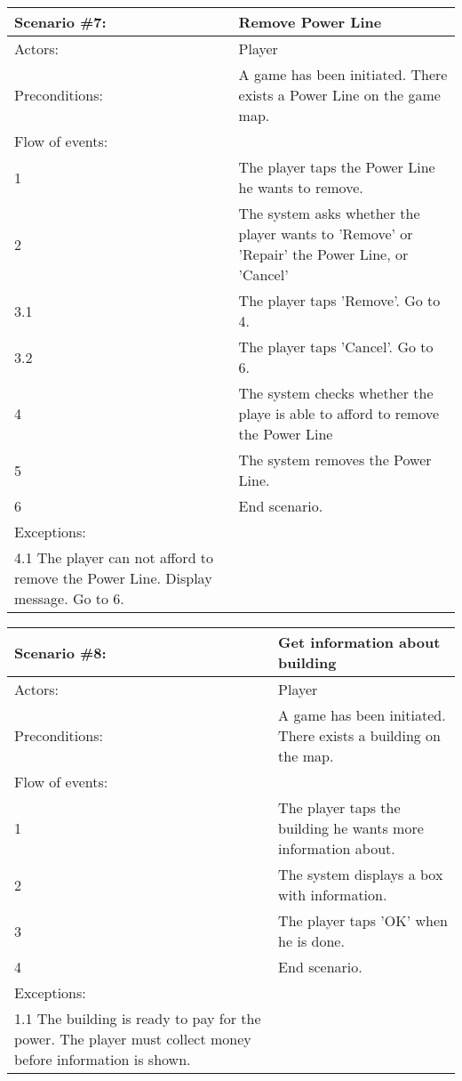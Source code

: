 \begin{tabular}{| l | p{10cm} |}
	\hline
	{\bf Scenario \#7:} & {\bf Remove Power Line} \\ \hline
	Actors: & Player \\ \hline
	Preconditions: & A game has been initiated. There exists a Power Line on the game map. \\ \hline
	Flow of events: & \\ \hline
	1 & The player taps the Power Line he wants to remove. \\ \hline
	2 & The system asks whether the player wants to 'Remove' or 'Repair' the Power Line, or 'Cancel' \\ \hline
	3.1 & The player taps 'Remove'. Go to 4. \\ \hline
	3.2 & The player taps 'Cancel'. Go to 6. \\ \hline
	4 & The system checks whether the playe is able to afford to remove the Power Line \\ \hline
	5 & The system removes the Power Line. \\ \hline
	6 & End scenario. \\ \hline
	Exceptions: & \\ \hline
	4.1 The player can not afford to remove the Power Line. Display message. Go to 6. \\ \hline
\end{tabular}

\begin{tabular}{| l | p{10cm} |}
	\hline
	{\bf Scenario \#8:} & {\bf Get information about building} \\ \hline
	Actors: & Player \\ \hline
	Preconditions: & A game has been initiated. There exists a building on the map. \\ \hline
	Flow of events: & \\ \hline
	1 & The player taps the building he wants more information about. \\ \hline
	2 & The system displays a box with information. \\ \hline
	3 & The player taps 'OK' when he is done. \\ \hline
	4 & End scenario. \\ \hline
	Exceptions: & \\ \hline
	1.1 The building is ready to pay for the power. The player must collect money before information is shown. \\ \hline
\end{tabular}

